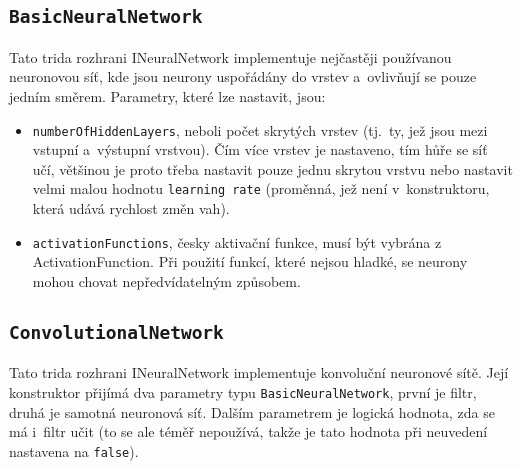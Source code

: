 \documentclass[12pt]{report}			%
\newcommand{\glsref}[1]{\glsdisp{#1}{\phantom{}}}
\begin{document}
				\subsection{\texttt{BasicNeuralNetwork}}
					Tato \gls{trida} \gls{rozhrani} INeuralNetwork implementuje nejčastěji používanou neuronovou síť, kde jsou neurony uspořádány do vrstev a~ovlivňují se pouze jedním směrem. Parametry, které lze nastavit, jsou:
					\begin{itemize}
						\item \verb!numberOfHiddenLayers!, neboli počet skrytých vrstev (tj.~ty, jež jsou mezi vstupní a~výstupní vrstvou). Čím více vrstev je nastaveno, tím hůře se síť učí, většinou je proto třeba nastavit pouze jednu skrytou vrstvu nebo nastavit velmi malou hodnotu \verb!learning rate! (proměnná, jež není v~konstruktoru, která udává rychlost změn vah).
						\item \verb!activationFunctions!, česky aktivační funkce, musí být vybrána z~ ActivationFunction. Při použití funkcí, které nejsou hladké, se neurony mohou chovat nepředvídatelným způsobem.
					\end{itemize}
					
				\subsection{\texttt{ConvolutionalNetwork}}
					Tato \gls{trida} \gls{rozhrani} INeuralNetwork implementuje konvoluční neuronové sítě. Její konstruktor přijímá dva parametry \gls{typ}u \verb!BasicNeuralNetwork!, první je filtr, druhá je samotná neuronová síť. Dalším parametrem je logická hodnota, zda se má i~filtr učit (to se ale téměř nepoužívá, takže je tato hodnota při neuvedení nastavena na \glsref{false}\verb!false!).
					
\end{document}
